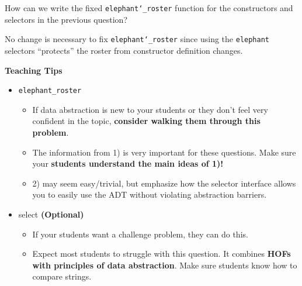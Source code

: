     
    \begin{blocksection}
    \question How can we write the fixed \texttt{elephant\char`_roster} function for
    the constructors and selectors in the previous question?
    
    \begin{solution}[1.5in]
    No change is necessary to fix \texttt{elephant\char`_roster} since using the
    \texttt{elephant} selectors ``protects'' the roster from constructor definition
    changes.
    \end{solution}
    
    \begin{guide}
    \textbf{Teaching Tips}
    \begin{itemize}
        \item \texttt{elephant\_roster}
        \begin{itemize}
            \item If data abstraction is new to your students or they don’t feel very confident in the topic, \textbf{consider walking them through this problem}.
            \item The information from 1) is very important for these questions. Make sure your \textbf{students understand the main ideas of 1)!}
            \item 2) may seem easy/trivial, but emphasize how the selector interface allows you to easily use the ADT without violating abstraction barriers.
        \end{itemize}
        \item select \textbf{(Optional)}
        \begin{itemize}
            \item If your students want a challenge problem, they can do this.
            \item Expect most students to struggle with this question. It combines \textbf{HOFs with principles of data abstraction}. Make sure students know how to compare strings.
        \end{itemize}
    \end{itemize}
    \end{guide}
    
    \end{blocksection}
    
